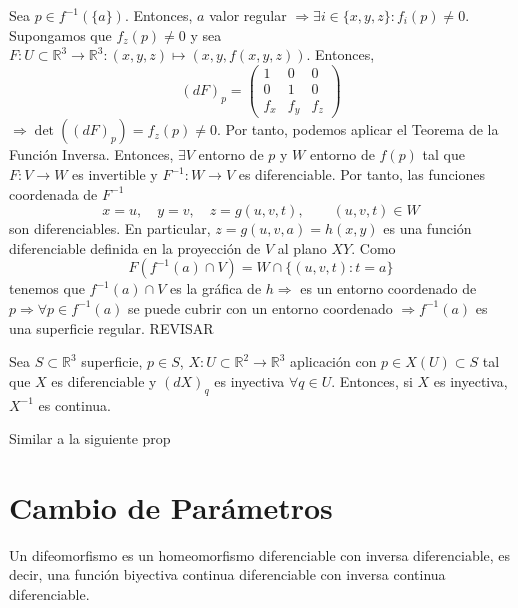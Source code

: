 \begin{dem}
  Sea $p \in f^{-1}(\{ a \})$. Entonces, $a$ valor regular $\Rightarrow \exists i \in \{ x, y, z \} : f_{i}(p) \neq 0$. Supongamos que $f_{z}(p) \neq 0$ y sea $F : U \subset \mathbb{R}^{3} \to \mathbb{R}^{3}: (x, y, z) \mapsto (x, y, f(x, y, z))$. Entonces,
  \[
    (d F)_{p} = 
    \begin{pmatrix}
       1 & 0 & 0\\
       0 & 1 & 0\\
       f_{x} & f_{y} & f_{z}
    \end{pmatrix}
  \]
  $\Rightarrow \det ( (d F)_{p}) = f_{z}(p) \neq 0$. Por tanto, podemos aplicar el Teorema de la Función Inversa. Entonces, $\exists V$ entorno de $p$ y $W$ entorno de $f(p)$ tal que $F : V \to W$ es invertible y $F^{-1} : W \to V$ es diferenciable. Por tanto, las funciones coordenada de $F^{-1}$
  \[ 
    x = u, \quad y = v, \quad z = g(u, v, t), \qquad (u, v, t) \in W
  \] 
  son diferenciables. En particular, $z = g(u, v, a) = h(x, y)$ es una función diferenciable definida en la proyección de $V$ al plano $XY$. Como
  \[ 
    F(f^{-1}(a) \cap V) = W \cap \{ (u, v, t) : t = a \}  
  \] 
  tenemos que $f^{-1}(a) \cap V$ es la gráfica de $h \Rightarrow$ es un entorno coordenado de $p \Rightarrow \forall p \in f^{-1}(a)$ se puede cubrir con un entorno coordenado $\Rightarrow f^{-1}(a)$ es una superficie regular. 
  REVISAR
\end{dem}

\begin{prop}
  Sea $S \subset \mathbb{R}^{3}$ superficie, $p \in S$, $X: U \subset \mathbb{R}^{2} \to \mathbb{R}^{3}$ aplicación con $p \in X(U) \subset S$ tal que $X$ es diferenciable y $(dX)_{q}$ es inyectiva $\forall q \in U$. Entonces, si $X$ es inyectiva, $X^{-1}$ es continua.
\end{prop}

\begin{dem}
  Similar a la siguiente prop
\end{dem}

\section{Cambio de Parámetros}

\begin{defn}[Difeomorfismo]
  Un difeomorfismo es un homeomorfismo diferenciable con inversa diferenciable, es decir, una función biyectiva continua diferenciable con inversa continua diferenciable.
\end{defn}

